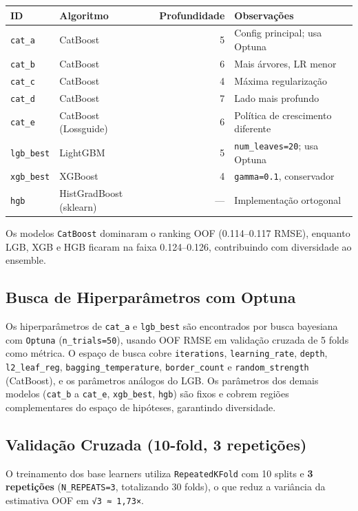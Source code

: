 \documentclass[12pt,a4paper]{article}
\begin{document}
\begin{center}
\begin{tabular}{llrl}
ID & Algoritmo & Profundidade & Observações\\
\hline
\texttt{cat\_a} & CatBoost & 5 & Config principal; usa Optuna\\
\texttt{cat\_b} & CatBoost & 6 & Mais árvores, LR menor\\
\texttt{cat\_c} & CatBoost & 4 & Máxima regularização\\
\texttt{cat\_d} & CatBoost & 7 & Lado mais profundo\\
\texttt{cat\_e} & CatBoost (Lossguide) & 6 & Política de crescimento diferente\\
\texttt{lgb\_best} & LightGBM & 5 & \texttt{num\_leaves=20}; usa Optuna\\
\texttt{xgb\_best} & XGBoost & 4 & \texttt{gamma=0.1}, conservador\\
\texttt{hgb} & HistGradBoost (sklearn) & — & Implementação ortogonal\\
\end{tabular}
\end{center}

Os modelos \texttt{CatBoost} dominaram o ranking OOF (0.114–0.117 RMSE), enquanto
LGB, XGB e HGB ficaram na faixa 0.124–0.126, contribuindo com diversidade ao
ensemble.
\subsection{Busca de Hiperparâmetros com Optuna}
\label{sec:orgd709ed2}

Os hiperparâmetros de \texttt{cat\_a} e \texttt{lgb\_best} são encontrados por busca
bayesiana com \texttt{Optuna} (\texttt{n\_trials=50}), usando OOF RMSE em validação cruzada
de 5 folds como métrica. O espaço de busca cobre \texttt{iterations},
\texttt{learning\_rate}, \texttt{depth}, \texttt{l2\_leaf\_reg}, \texttt{bagging\_temperature},
\texttt{border\_count} e \texttt{random\_strength} (CatBoost), e os parâmetros análogos do
LGB. Os parâmetros dos demais modelos (\texttt{cat\_b} a \texttt{cat\_e}, \texttt{xgb\_best}, \texttt{hgb})
são fixos e cobrem regiões complementares do espaço de hipóteses, garantindo
diversidade.
\subsection{Validação Cruzada (10-fold, 3 repetições)}
\label{sec:orge46a8cb}

O treinamento dos base learners utiliza \texttt{RepeatedKFold} com 10 splits e
\textbf{3 repetições} (\texttt{N\_REPEATS=3}, totalizando 30 folds), o que reduz a
variância da estimativa OOF em \texttt{√3 ≈ 1,73×}.
\end{document}
